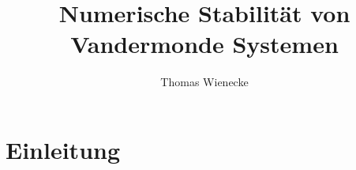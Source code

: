 \documentclass[a4paper, 11pt]{scrreprt}
\title{Numerische Stabilität von Vandermonde Systemen}
\author{Thomas Wienecke}
\begin{document}
\maketitle
\tableofcontents

\chapter{Einleitung}

%








\end{document}
